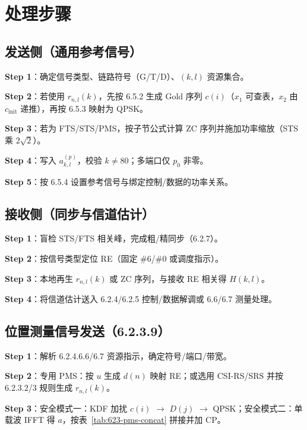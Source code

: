 \documentclass[11pt,a4paper]{ctexart}
\begin{document}
\section{处理步骤}

\subsection{发送侧（通用参考信号）}

\textbf{Step 1}：确定信号类型、链路符号（G/T/D）、$(k,l)$ 资源集合。

\textbf{Step 2}：若使用 $r_{n,l}(k)$，先按 6.5.2 生成 Gold 序列 $c(i)$（$x_1$ 可查表，$x_2$ 由 $c_{\mathrm{init}}$ 递推），再按 6.5.3 映射为 QPSK。

\textbf{Step 3}：若为 FTS/STS/PMS，按子节公式计算 ZC 序列并施加功率缩放（STS 乘 $2\sqrt{2}$）。

\textbf{Step 4}：写入 $a_{k,l}^{(p)}$，校验 $k{\neq}80$；多端口仅 $p_0$ 非零。

\textbf{Step 5}：按 6.5.4 设置参考信号与绑定控制/数据的功率关系。

\subsection{接收侧（同步与信道估计）}

\textbf{Step 1}：盲检 STS/FTS 相关峰，完成粗/精同步（6.2.7）。

\textbf{Step 2}：按信号类型定位 RE（固定 \#6/\#0 或调度指示）。

\textbf{Step 3}：本地再生 $r_{n,l}(k)$ 或 ZC 序列，与接收 RE 相关得 $H(k,l)$。

\textbf{Step 4}：将信道估计送入 6.2.4/6.2.5 控制/数据解调或 6.6/6.7 测量处理。

\subsection{位置测量信号发送（6.2.3.9）}

\textbf{Step 1}：解析 6.2.4.6.6/6.7 资源指示，确定符号/端口/带宽。

\textbf{Step 2}：专用 PMS：按 $u$ 生成 $d(n)$ 映射 RE；或选用 CSI-RS/SRS 并按 6.2.3.2/3 规则生成 $r_{n,l}(k)$。

\textbf{Step 3}：安全模式一：KDF 加扰 $c(i)$ $\rightarrow$ $D(j)$ $\rightarrow$ QPSK；安全模式二：单载波 IFFT 得 $a$，按表~\ref{tab:623-pms-concat} 拼接并加 CP。
\end{document}
